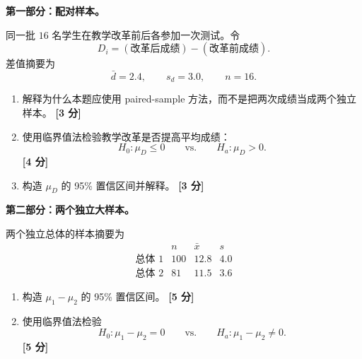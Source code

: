 \documentclass[11pt,a4paper]{article}
\newcommand{\pts}[1]{\hfill\textbf{[#1 分]}}
\begin{document}
\begin{questionbox}[第 3 题：配对样本与两个独立大样本（20 分）]
\textbf{第一部分：配对样本。}

同一批 $16$ 名学生在教学改革前后各参加一次测试。令
\[
  D_i=(\text{改革后成绩})-(\text{改革前成绩}).
\]
差值摘要为
\[
  \bar d=2.4,
  \qquad
  s_d=3.0,
  \qquad
  n=16.
\]

\begin{enumerate}
  \item 解释为什么本题应使用 paired-sample 方法，而不是把两次成绩当成两个独立样本。 \pts{3}

  \item 使用临界值法检验教学改革是否提高平均成绩：
  \[
    H_0:\mu_D\leq0
    \qquad\text{vs.}\qquad
    H_a:\mu_D>0.
  \]
  \pts{4}

  \item 构造 $\mu_D$ 的 95\% 置信区间并解释。 \pts{3}
\end{enumerate}

\textbf{第二部分：两个独立大样本。}

两个独立总体的样本摘要为
\[
\begin{array}{c|ccc}
 & n & \bar x & s\\
\hline
\text{总体 1} & 100 & 12.8 & 4.0\\
\text{总体 2} & 81 & 11.5 & 3.6
\end{array}
\]

\begin{enumerate}[resume]
  \item 构造 $\mu_1-\mu_2$ 的 95\% 置信区间。 \pts{5}

  \item 使用临界值法检验
  \[
    H_0:\mu_1-\mu_2=0
    \qquad\text{vs.}\qquad
    H_a:\mu_1-\mu_2\ne0.
  \]
  \pts{5}
\end{enumerate}
\end{questionbox}
\end{document}
